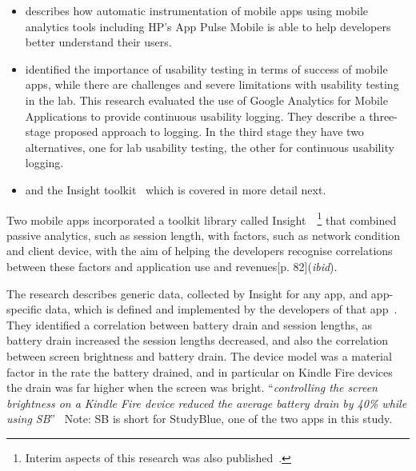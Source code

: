 \begin{itemize}
    \item \textcite{parate2016_RECKON_an_analytics_framework_for_app_developers_HP_AppPulseMobile} describes how automatic instrumentation of mobile apps using mobile analytics tools including HP's App Pulse Mobile is able to help developers better understand their users.
    \item \textcite{ferre2017_extending_mobile_app_analytics_for_usability_test_logging} identified the importance of usability testing in terms of success of mobile apps, while there are challenges and severe limitations with usability testing in the lab. This research evaluated the use of Google Analytics for Mobile Applications to provide continuous usability logging. They describe a three-stage proposed approach to logging. In the third stage they have two alternatives, one for lab usability testing, the other for continuous usability logging.
    \item and the Insight toolkit~\textcite{patro2013_capturing_mobile_experience_in_the_wild} which is covered in more detail next.
\end{itemize}   

Two mobile apps incorporated a toolkit library called Insight~\cite[p. 82]{patro2015_building_blocks_to_understand_wireless_experience}~\footnote{Interim aspects of this research was also published~\textcite{patro2013_capturing_mobile_experience_in_the_wild}.} that combined passive analytics, such as session length, with factors, such as network condition and client device, with the aim of helping the developers recognise correlations between these factors and application use and revenues[p. 82](\textit{ibid}).

The research describes generic data, collected by Insight for any app, and app-specific data, which is defined and implemented by the developers of that app~\cite[pp. 87-88]{patro2015_building_blocks_to_understand_wireless_experience}. They identified a correlation between battery drain and session lengths, as battery drain increased the session lengths decreased, and also the correlation between screen brightness and battery drain. The device model was a material factor in the rate the battery drained, and in particular on Kindle Fire devices the drain was far higher when the screen was bright. ``\emph{controlling the screen brightness on a Kindle Fire device reduced the average battery drain by 40\% while using SB}''~\cite[p. 13]{patro2015_building_blocks_to_understand_wireless_experience} Note: SB is short for StudyBlue, one of the two apps in this study.

